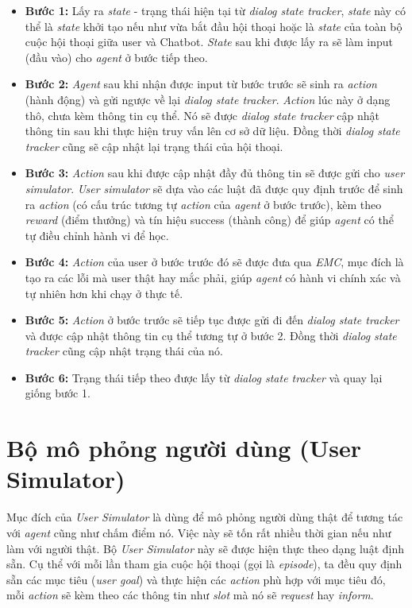 \begin{itemize}
    \item \textbf{Bước 1:} Lấy ra \textit{state} - trạng thái hiện tại từ \textit{dialog state tracker}, \textit{state} này có thể là \textit{state} khởi tạo nếu như vừa bắt đầu hội thoại hoặc là \textit{state} của toàn bộ cuộc hội thoại giữa user và Chatbot. \textit{State} sau khi được lấy ra sẽ làm input (đầu vào) cho \textit{agent} ở bước tiếp theo.
    \item \textbf{Bước 2:} \textit{Agent} sau khi nhận được input từ bước trước sẽ sinh ra \textit{action} (hành động) và gửi ngược về lại \textit{dialog state tracker}. \textit{Action} lúc này ở dạng thô, chưa kèm thông tin cụ thể. Nó sẽ được \textit{dialog state tracker} cập nhật thông tin sau khi thực hiện truy vấn lên cơ sở dữ liệu. Đồng thời \textit{dialog state tracker} cũng sẽ cập nhật lại trạng thái của hội thoại.
    \item \textbf{Bước 3:} \textit{Action} sau khi được cập nhật đầy đủ thông tin sẽ được gửi cho \textit{user simulator}. \textit{User simulator} sẽ dựa vào các luật đã được quy định trước để sinh ra \textit{action} (có cấu trúc tương tự \textit{action} của \textit{agent} ở bước trước), kèm theo \textit{reward} (điểm thưởng) và tín hiệu success (thành công) để giúp \textit{agent} có thể tự điều chỉnh hành vi để học.
    \item \textbf{Bước 4:} \textit{Action} của user ở bước trước đó sẽ được đưa qua \textit{EMC}, mục đích là tạo ra các lỗi mà user thật hay mắc phải, giúp \textit{agent} có hành vi chính xác và tự nhiên hơn khi chạy ở thực tế.
    \item \textbf{Bước 5:} \textit{Action} ở bước trước sẽ tiếp tục được gửi đi đến \textit{dialog state tracker} và được cập nhật thông tin cụ thể tương tự ở bước 2. Đồng thời \textit{dialog state tracker} cũng cập nhật trạng thái của nó.
    \item \textbf{Bước 6:} Trạng thái tiếp theo được lấy từ \textit{dialog state tracker} và quay lại giống bước 1.
\end{itemize}

\section{Bộ mô phỏng người dùng (User Simulator)}
Mục đích của \textit{User Simulator} là dùng để mô phỏng người dùng thật để tương tác với \textit{agent} cũng như chấm điểm nó. Việc này sẽ tốn rất nhiều thời gian nếu như làm với người thật. Bộ \textit{User Simulator} này sẽ được hiện thực theo dạng luật định sẵn. Cụ thể với mỗi lần tham gia cuộc hội thoại (gọi là \textit{episode}), ta đều quy định sẵn các mục tiêu (\textit{user goal}) và thực hiện các \textit{action} phù hợp với mục tiêu đó, mỗi \textit{action} sẽ kèm theo các thông tin như \textit{slot} mà nó sẽ \textit{request} hay \textit{inform}.

